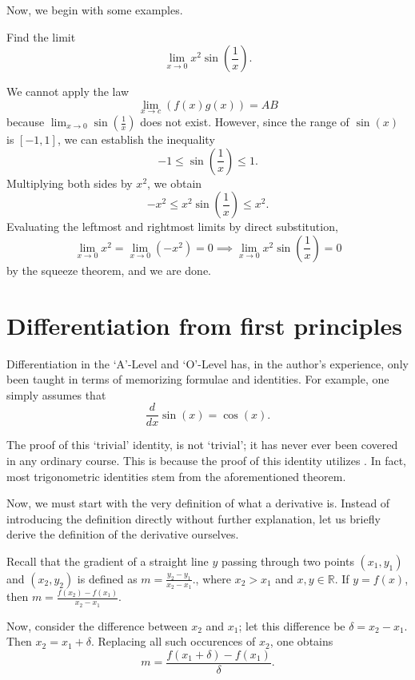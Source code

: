 Now, we begin with some examples.

\begin{example}
    Find the limit \[\lim_{x \to 0}x^2\sin\left(\frac{1}{x}\right).\]
\end{example}
\begin{solution}
    We cannot apply the law
    \[
    \lim_{x \to c} (f(x) g(x)) = A B
    \]
    because $\lim_{x \to 0} \sin\left(\frac{1}{x}\right)$ does not exist. However, since the range of $\sin(x)$
    is $[-1, 1]$, we can establish the inequality \[-1 \le \sin\left(\frac{1}{x}\right) \le 1.\] Multiplying both
    sides by $x^2$, we obtain \[-x^2 \le x^2 \sin\left(\frac{1}{x}\right) \le x^2.\]
    Evaluating the leftmost and
    rightmost limits by direct substitution,
    \[\lim_{x \to 0} x^2 = \lim_{x \to 0} (-x^2) = 0 \implies
    \lim_{x \to 0} x^2 \sin\left(\frac{1}{x}\right) = 0 \]
    by the squeeze theorem, and we are done.
\end{solution}

\section{Differentiation from first principles}
Differentiation in the `A'-Level and `O'-Level has, in the author's experience, only been taught in terms of
memorizing formulae and identities. For example, one simply assumes that \[\frac{d}{dx}\sin(x) = \cos(x).\]

The proof of this `trivial' identity, is not `trivial'; it has never ever been covered in any
ordinary course. This is because the proof of this identity utilizes .
In fact, most trigonometric identities stem from the aforementioned theorem.

Now, we must start with the very definition of what a
derivative is. Instead of introducing the definition directly without further explanation, let us
briefly derive the definition of the derivative ourselves.

Recall that the gradient of a straight line $y$ passing through two points $(x_1, y_1)$ and $(x_2, y_2)$ is
defined as $m = \frac{y_2 - y_1}{x_2 - x_1}.$, where $x_2 > x_1$ and $x,y \in \mathbb{R}$.
If $y = f(x)$, then $m = \frac{f(x_2) - f(x_1)}{x_2 - x_1}.$

Now, consider the difference between $x_2$ and $x_1$; let this difference be
$\delta = x_2 - x_1$. Then $x_2 = x_1 + \delta$. Replacing all such occurences of $x_2$, one obtains
\[m = \frac{f(x_1 + \delta) - f(x_1)}{\delta}.\]

